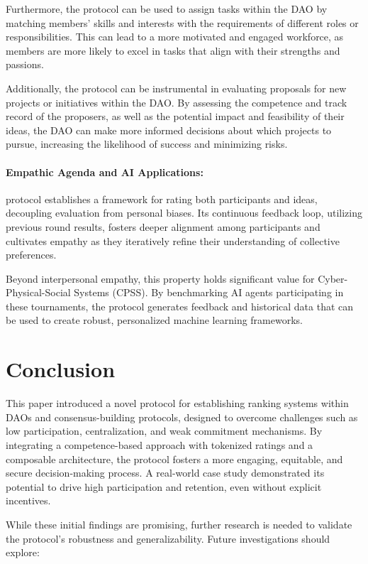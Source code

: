 \documentclass{article}
\begin{document}
\begin{CJK}{UTF8}{gbsn}
\begin{multicols}{2}
        Furthermore, the protocol can be used to assign tasks within the DAO by matching members' skills and interests with the requirements of different roles or responsibilities. This can lead to a more motivated and engaged workforce, as members are more likely to excel in tasks that align with their strengths and passions.

        Additionally, the protocol can be instrumental in evaluating proposals for new projects or initiatives within the DAO. By assessing the competence and track record of the proposers, as well as the potential impact and feasibility of their ideas, the DAO can make more informed decisions about which projects to pursue, increasing the likelihood of success and minimizing risks.

        \paragraph*{Empathic Agenda and AI Applications:} protocol establishes a framework for rating both participants and ideas, decoupling evaluation from personal biases. Its continuous feedback loop, utilizing previous round results, fosters deeper alignment among participants and cultivates empathy as they iteratively refine their understanding of collective preferences.

        Beyond interpersonal empathy, this property holds significant value for Cyber-Physical-Social Systems (CPSS). By benchmarking AI agents participating in these tournaments, the protocol generates feedback and historical data that can be used to create robust, personalized machine learning frameworks.
    \end{multicols}
        \section{Conclusion}

        This paper introduced a novel protocol for establishing ranking systems within DAOs and consensus-building protocols, designed to overcome challenges such as low participation, centralization, and weak commitment mechanisms. By integrating a competence-based approach with tokenized ratings and a composable architecture, the protocol fosters a more engaging, equitable, and secure decision-making process.  A real-world case study demonstrated its potential to drive high participation and retention, even without explicit incentives.

        While these initial findings are promising, further research is needed to validate the protocol's robustness and generalizability. Future investigations should explore:


\end{CJK}
\end{document}

